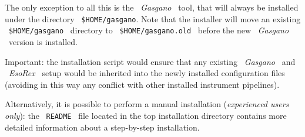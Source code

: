 \begin{enumerate}
The only exception to all this is the \ {\it Gasgano} \ tool, that will 
always be installed under the directory \ {\tt \$HOME/gasgano}. Note that 
the installer will move an existing \ {\tt \$HOME/gasgano} \ directory to 
\ {\tt \$HOME/gasgano.old} \ before the new \ {\it Gasgano} \ version is 
installed.

Important: the installation script would ensure that any existing 
\ {\it Gasgano} \  and \ {\it EsoRex} \ setup would be inherited 
into the newly installed configuration files (avoiding in this way 
any conflict with other installed instrument pipelines).
\end{enumerate}

Alternatively, it is possible to perform a manual installation 
({\it experienced users only}): the \ {\tt README} \ file located 
in the top installation directory contains more detailed information 
about a step-by-step installation. 

